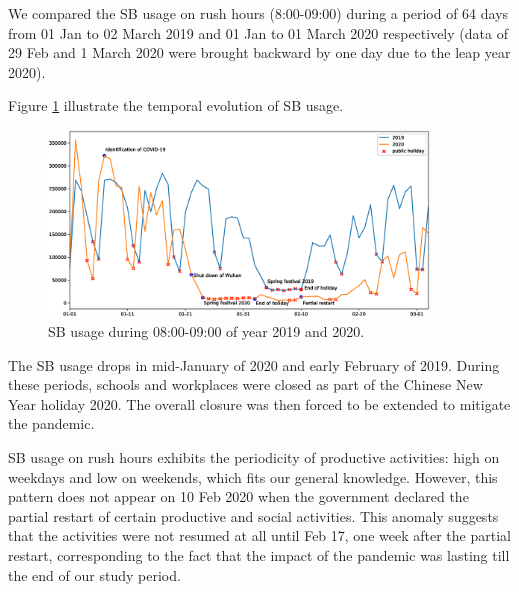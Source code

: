 \documentclass[preprints,ijgi,submit,moreauthors]{Definitions/mdpi}
\begin{document}
We compared the SB usage on rush hours (8:00-09:00) during a period of 64 days from 01 Jan to 02 March 2019 and 01 Jan to 01 March 2020 respectively (data of 29 Feb and 1 March 2020 were brought backward by one day due to the leap year 2020).


Figure \ref{fig:hour_comparison_8} %
 illustrate the temporal evolution of SB usage.

\begin{figure}[ht]
    \centering
    \includegraphics[width=0.9\textwidth]{Figures/hour_8.eps}
    \caption{SB usage during 08:00-09:00 of year 2019 and 2020.}
    \label{fig:hour_comparison_8}
\end{figure}

The SB usage drops in mid-January of 2020 and early February of 2019.
During these periods, schools and workplaces were closed as part of the Chinese New Year holiday 2020.
The overall closure was then forced to be extended to mitigate the pandemic.

SB usage on rush hours exhibits the periodicity of productive activities: high on weekdays and low on weekends, which fits our general knowledge.
However, this pattern does not appear on 10 Feb 2020 when the government declared the partial restart of certain productive and social activities.
This anomaly suggests that the activities were not resumed at all until Feb 17, one week after the partial restart, corresponding to the fact that the impact of the pandemic was lasting till the end of our study period.
\end{document}

